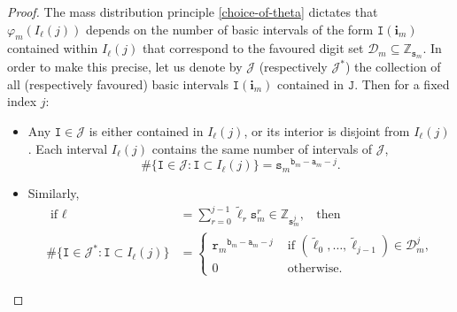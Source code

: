\documentclass[12pt, twoside]{article}
\theoremstyle{definition}
\numberwithin{equation}{section}
\begin{document}
\begin{proof} 
	The mass distribution principle  \eqref{choice-of-theta} dictates that $\varphi_m({I}_{\ell}(j))$ depends on the number of basic intervals of the form $\mathtt I(\mathbf i_m)$ contained within ${I}_{\ell}(j)$ that correspond to the favoured digit set $\mathscr{D}_m \subseteq \mathbb Z_{\mathtt s_m}$. In order to make this precise, let us denote by $\mathscr{J}$ (respectively $\mathscr{J}^{\ast}$) the collection of all (respectively favoured) basic intervals $\mathtt I(\mathbf i_m)$ contained in $\mathtt J$. 
	Then for a fixed index $j$:
	\begin{itemize} 
		\item Any $\mathtt I \in \mathscr{J}$ is either contained in ${I}_{\ell}(j)$, or its interior is disjoint from $I_{\ell}(j)$. Each interval $I_{\ell}(j)$ contains the same number of intervals of $\mathscr{J}$,
		\begin{equation} 
			\# \bigl\{\mathtt I \in \mathscr{J} : \mathtt I \subset {I}_{\ell}(j) \bigr\} = {\mathtt s_m}^{\mathtt b_m - \mathtt a_m-j}.
		\end{equation}
		\item Similarly, 
		\begin{equation}  \label{favoured-numbers} 
			\begin{aligned} 
				\text{ if } \ell &= \sum_{r=0}^{j-1} \tilde{\ell}_r \mathtt s_m^{r} \in \mathbb Z_{\mathtt s_m^j}, \; \; \text{ then } \\  \# \bigl\{\mathtt I \in \mathscr{J}^{\ast} : \mathtt I \subset {I}_{\ell}(j) \bigr\} &= \begin{cases}  {\mathtt r_m}^{\mathtt b_m - \mathtt a_m - j} &\text{ if $(\tilde{\ell}_0, \ldots, \tilde{\ell}_{j-1}) \in \mathscr{D}_m^j$}, \\ 0 &\text{ otherwise.}  \end{cases} \end{aligned} \end{equation} 

\end{itemize}
\end{proof}
\end{document}
